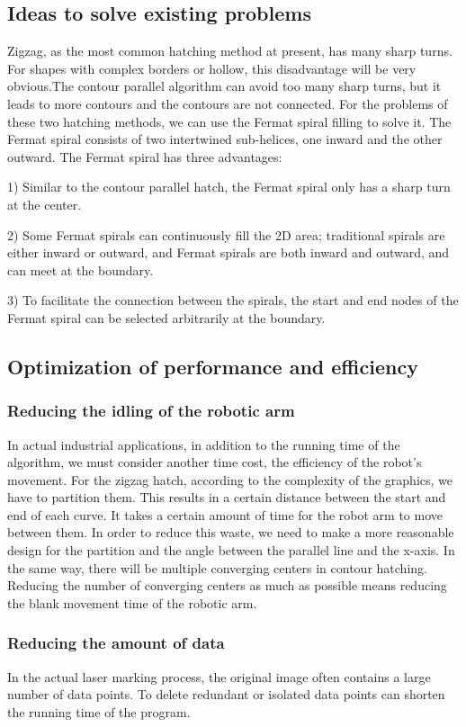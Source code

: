 \documentclass{apmcmthesis}
\begin{document}
\subsection{Ideas to solve existing problems}
Zigzag, as the most common hatching method at present, has many sharp turns. For shapes with complex borders or hollow, this disadvantage will be very obvious.The contour parallel algorithm can avoid too many sharp turns, but it leads to more contours and the contours are not connected. For the problems of these two hatching methods, we can use the Fermat spiral filling to solve it. The Fermat spiral consists of two intertwined sub-helices, one inward and the other outward. The Fermat spiral has three advantages:


1) Similar to the contour parallel hatch, the Fermat spiral only has a sharp turn at the center.


2) Some Fermat spirals can continuously fill the 2D area; traditional spirals are either inward or outward, and Fermat spirals are both inward and outward, and can meet at the boundary.


3) To facilitate the connection between the spirals, the start and end nodes of the Fermat spiral can be selected arbitrarily at the boundary.
\subsection{Optimization of performance and efficiency}
\subsubsection{Reducing the idling of the robotic arm}
In actual industrial applications, in addition to the running time of the algorithm, we must consider another time cost, the efficiency of the robot's movement. For the zigzag hatch, according to the complexity of the graphics, we have to partition them. This results in a certain distance between the start and end of each curve. It takes a certain amount of time for the robot arm to move between them. In order to reduce this waste, we need to make a more reasonable design for the partition and the angle between the parallel line and the x-axis. In the same way, there will be multiple converging centers in contour hatching. Reducing the number of converging centers as much as possible means reducing the blank movement time of the robotic arm.

\subsubsection{Reducing the amount of data}
In the actual laser marking process, the original image often contains a large number of data points. To delete redundant or isolated data points can shorten the running time of the program.
\end{document}
